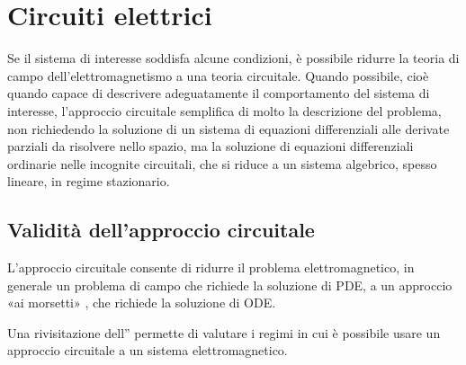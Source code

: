\documentclass[letterpaper,10pt,italian]{jupyterBook}
\begin{document}
\section{Circuiti elettrici}
\label{\detokenize{ch/circuits-electric:circuiti-elettrici}}\label{\detokenize{ch/circuits-electric:classical-electromagnetism-circuits-electric}}\label{\detokenize{ch/circuits-electric::doc}}
\sphinxAtStartPar
Se il sistema di interesse soddisfa alcune condizioni, è possibile ridurre la teoria di campo dell’elettromagnetismo a una teoria circuitale.
Quando possibile, cioè quando capace di descrivere adeguatamente il comportamento del sistema di interesse, l’approccio circuitale semplifica di molto la descrizione del problema, non richiedendo la soluzione di un sistema di equazioni differenziali alle derivate parziali da risolvere nello spazio, ma la soluzione di equazioni differenziali ordinarie nelle incognite circuitali, che si riduce a un sistema algebrico, spesso lineare, in regime stazionario.

\sphinxAtStartPar
{}

\sphinxAtStartPar
{}

\sphinxstepscope




\subsection{Validità dell’approccio circuitale}
\label{\detokenize{ch/circuits-electric-approximation:validita-dell-approccio-circuitale}}\label{\detokenize{ch/circuits-electric-approximation:classical-electromagnetism-circuits-electric-approximation}}\label{\detokenize{ch/circuits-electric-approximation::doc}}
\sphinxAtStartPar
L’approccio circuitale consente di ridurre il problema elettromagnetico, in generale un problema di campo che richiede la soluzione di PDE, a un approccio «ai morsetti» , che richiede la soluzione di ODE.

\sphinxAtStartPar
Una rivisitazione dell”{\hyperref[\detokenize{ch/energy-linear:classical-electromagnetism-energy}]{}} permette di valutare i regimi in cui è possibile usare un approccio circuitale a un sistema elettromagnetico.
\end{document}
